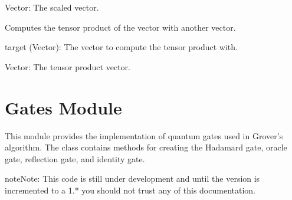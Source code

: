 \documentclass[letterpaper,10pt,english]{sphinxmanual}
\begin{document}
\begin{fulllineitems}
\begin{fulllineitems}
\begin{description}
\sphinxAtStartPar
Vector: The scaled vector.

\end{description}

\end{fulllineitems}


\begin{fulllineitems}
\label{\detokenize{index:utils.tensor.Vector.tensor}}
\pysigstartsignatures
{}
\pysigstopsignatures
\sphinxAtStartPar
Computes the tensor product of the vector with another vector.
\begin{description}
\sphinxAtStartPar
target (Vector): The vector to compute the tensor product with.

\sphinxAtStartPar
Vector: The tensor product vector.

\end{description}

\end{fulllineitems}


\end{fulllineitems}


\chapter{Gates Module}
\label{\detokenize{index:gates-module}}\label{\detokenize{index:module-gates}}
\sphinxAtStartPar
This module provides the implementation of quantum gates used in Grover’s algorithm.
The  class contains methods for creating the Hadamard gate, oracle gate,
reflection gate, and identity gate.

\begin{sphinxadmonition}{note}{Note:}
\sphinxAtStartPar
This code is still under development and until the version
is incremented to a 1.* you should not trust any of this
documentation.
\end{sphinxadmonition}
\end{document}
